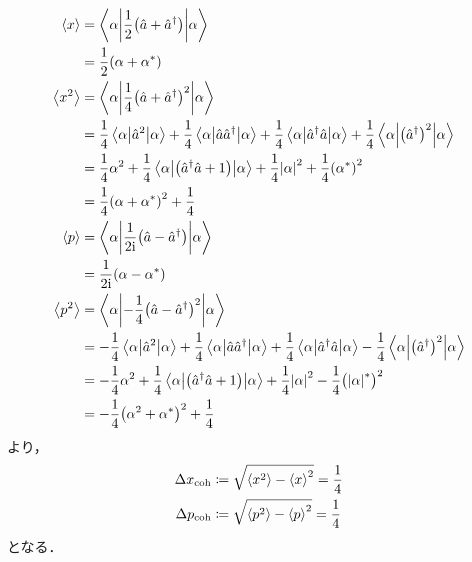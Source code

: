 \documentclass{report}
\begin{document}
    \begin{align}
      \ev{x} &= \mel**{\alpha}{\frac{1}{2}\qty(\hat{a} + \hat{a}^{\dag})}{\alpha} \\ 
      &= \frac{1}{2}\qty(\alpha + \alpha^*) \\ 
      \ev{x^2} &= \mel**{\alpha}{\frac{1}{4}\qty(\hat{a} + \hat{a}^{\dag})^2}{\alpha} \\ 
      &= \frac{1}{4}\mel**{\alpha}{\hat{a}^2}{\alpha} + \frac{1}{4}\mel**{\alpha}{\hat{a}\hat{a}^{\dag}}{\alpha} + \frac{1}{4}\mel**{\alpha}{\hat{a}^{\dag}\hat{a}}{\alpha} + \frac{1}{4}\mel**{\alpha}{\qty(\hat{a}^{\dag})^2}{\alpha} \\ 
      &= \frac{1}{4}\alpha^2 + \frac{1}{4}\mel**{\alpha}{\qty(\hat{a}^{\dag}\hat{a} + 1)}{\alpha} + \frac{1}{4}\abs{\alpha}^2 + \frac{1}{4}\qty(\alpha^*)^2 \\ 
      &= \frac{1}{4}\qty(\alpha + \alpha^*)^2 + \frac{1}{4} \\ 
      \ev{p} &= \mel**{\alpha}{\frac{1}{2\i}\qty(\hat{a} - \hat{a}^{\dag})}{\alpha} \\ 
      &= \frac{1}{2\i}\qty(\alpha - \alpha^*) \\ 
      \ev{p^2} &= \mel**{\alpha}{-\frac{1}{4}\qty(\hat{a} - \hat{a}^{\dag})^2}{\alpha} \\ 
      &= -\frac{1}{4}\mel**{\alpha}{\hat{a}^2}{\alpha} + \frac{1}{4}\mel**{\alpha}{\hat{a}\hat{a}^{\dag}}{\alpha} + \frac{1}{4}\mel**{\alpha}{\hat{a}^{\dag}\hat{a}}{\alpha} - \frac{1}{4}\mel**{\alpha}{\qty(\hat{a}^{\dag})^2}{\alpha} \\ 
      &= -\frac{1}{4}\alpha^2 + \frac{1}{4}\mel**{\alpha}{\qty(\hat{a}^{\dag}\hat{a} + 1)}{\alpha} + \frac{1}{4}\abs{\alpha}^2 - \frac{1}{4}\qty(\abs{\alpha}^{*})^2 \\ 
      &= -\frac{1}{4}\qty(\alpha^2 + \alpha^*)^2 + \frac{1}{4}
    \end{align}
    より，
    \begin{align}
      \Delta x_{\r{coh}} &\coloneqq \sqrt{\ev{x^2} - \ev{x}^2} = \frac{1}{4} \\ 
      \Delta p_{\r{coh}} &\coloneqq \sqrt{\ev{p^2} - \ev{p}^2} = \frac{1}{4}
    \end{align}
    となる．
\end{document}
